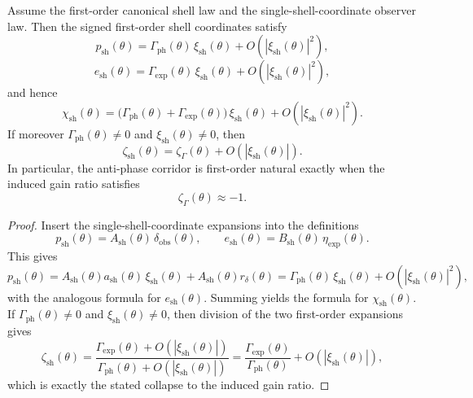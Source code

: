 \begin{theorem}
Assume the first-order canonical shell law and the single-shell-coordinate observer law. Then the signed first-order shell coordinates satisfy
\[
  p_{\mathrm{sh}}(\theta)=\Gamma_{\mathrm{ph}}(\theta)\,\xi_{\mathrm{sh}}(\theta)+O\!\left(|\xi_{\mathrm{sh}}(\theta)|^2\right),
\]
\[
  e_{\mathrm{sh}}(\theta)=\Gamma_{\mathrm{exp}}(\theta)\,\xi_{\mathrm{sh}}(\theta)+O\!\left(|\xi_{\mathrm{sh}}(\theta)|^2\right),
\]
and hence
\[
  \chi_{\mathrm{sh}}(\theta)
  =\bigl(\Gamma_{\mathrm{ph}}(\theta)+\Gamma_{\mathrm{exp}}(\theta)\bigr)\,\xi_{\mathrm{sh}}(\theta)
  +O\!\left(|\xi_{\mathrm{sh}}(\theta)|^2\right).
\]
If moreover $\Gamma_{\mathrm{ph}}(\theta)\neq 0$ and $\xi_{\mathrm{sh}}(\theta)\neq 0$, then
\[
  \zeta_{\mathrm{sh}}(\theta)
  =\zeta_{\Gamma}(\theta)+O\!\left(|\xi_{\mathrm{sh}}(\theta)|\right).
\]
In particular, the anti-phase corridor is first-order natural exactly when the induced gain ratio satisfies
\[
  \zeta_{\Gamma}(\theta)\approx -1.
\]
\end{theorem}

\begin{proof}
Insert the single-shell-coordinate expansions into the definitions
\[
  p_{\mathrm{sh}}(\theta)=A_{\mathrm{sh}}(\theta)\,\delta_{\mathrm{obs}}(\theta),
  \qquad
  e_{\mathrm{sh}}(\theta)=B_{\mathrm{sh}}(\theta)\,\eta_{\mathrm{exp}}(\theta).
\]
This gives
\[
  p_{\mathrm{sh}}(\theta)
  =A_{\mathrm{sh}}(\theta)a_{\mathrm{sh}}(\theta)\,\xi_{\mathrm{sh}}(\theta)
   +A_{\mathrm{sh}}(\theta)r_{\delta}(\theta)
  =\Gamma_{\mathrm{ph}}(\theta)\,\xi_{\mathrm{sh}}(\theta)+O\!\left(|\xi_{\mathrm{sh}}(\theta)|^2\right),
\]
with the analogous formula for $e_{\mathrm{sh}}(\theta)$. Summing yields the formula for $\chi_{\mathrm{sh}}(\theta)$. If $\Gamma_{\mathrm{ph}}(\theta)\neq 0$ and $\xi_{\mathrm{sh}}(\theta)\neq 0$, then division of the two first-order expansions gives
\[
  \zeta_{\mathrm{sh}}(\theta)
  =\frac{\Gamma_{\mathrm{exp}}(\theta)+O(|\xi_{\mathrm{sh}}(\theta)|)}{\Gamma_{\mathrm{ph}}(\theta)+O(|\xi_{\mathrm{sh}}(\theta)|)}
  =\frac{\Gamma_{\mathrm{exp}}(\theta)}{\Gamma_{\mathrm{ph}}(\theta)}+O\!\left(|\xi_{\mathrm{sh}}(\theta)|\right),
\]
which is exactly the stated collapse to the induced gain ratio.
\end{proof}

